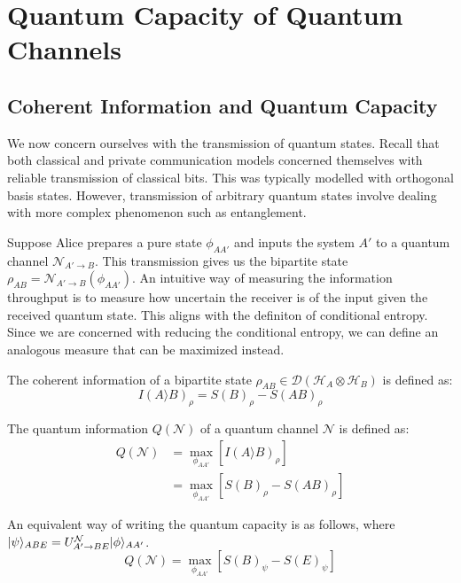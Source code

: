 \section{Quantum Capacity of Quantum Channels}

\subsection{Coherent Information and Quantum Capacity}

We now concern ourselves with the transmission of quantum states. Recall that both classical and private communication models concerned themselves with reliable transmission of classical bits. This was typically modelled with orthogonal basis states. However, transmission of arbitrary quantum states involve dealing with more complex phenomenon such as entanglement.

Suppose Alice prepares a pure state $\phi_{AA'}$ and inputs the system $A'$ to a quantum channel $\mathcal{N}_{A' \rightarrow B}$. This transmission gives us the bipartite state $\rho_{AB} = \mathcal{N}_{A' \rightarrow B} (\phi_{AA'})$. An intuitive way of measuring the information throughput is to measure how uncertain the receiver is of the input given the received quantum state. This aligns with the definiton of conditional entropy. Since we are concerned with reducing the conditional entropy, we can define an analogous measure that can be maximized instead.

\begin{definition}
The coherent information of a bipartite state $\rho_{AB} \in \mathcal{D}(\mathcal{H}_A \otimes \mathcal{H}_B)$ is defined as:
$$I(A \rangle B)_{\rho} = S(B)_{\rho} - S(AB)_{\rho}$$
\end{definition}

\begin{definition}
The quantum information $Q(\mathcal{N})$ of a quantum channel $\mathcal{N}$ is defined as:
\begin{align*}
Q(\mathcal{N}) &= \max_{\phi_{AA'}} \left[ I(A \rangle B)_{\rho} \right] \\
&= \max_{\phi_{AA'}} \left[ S(B)_\rho - S(AB)_\rho \right]
\end{align*}
\end{definition}

\noindent An equivalent way of writing the quantum capacity is as follows, where $\lvert\psi\rangle_{ABE} = U_{A' \rightarrow BE}^{\mathcal{N}} \lvert\phi\rangle_{AA'}$.
$$Q(\mathcal{N}) = \max_{\phi_{AA'}} \left[ S(B)_\psi - S(E)_\psi \right]$$

